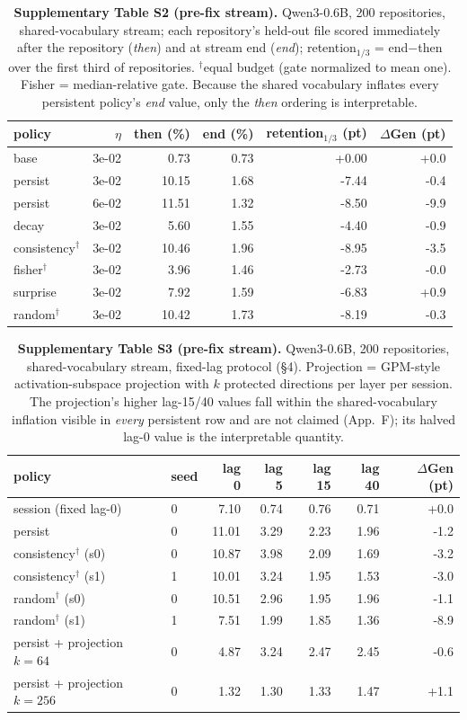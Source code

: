 \begin{table}[h]\centering\small
\caption{\textbf{Supplementary Table S2 (pre-fix stream).} Qwen3-0.6B, 200 repositories, shared-vocabulary stream; each repository's held-out file scored immediately after the repository (\emph{then}) and at stream end (\emph{end}); retention$_{1/3}$ = end$-$then over the first third of repositories. $^\dagger$equal budget (gate normalized to mean one). Fisher = median-relative gate. Because the shared vocabulary inflates every persistent policy's \emph{end} value, only the \emph{then} ordering is interpretable.}
\begin{tabular}{l r r r r r}\toprule
policy & $\eta$ & then (\%) & end (\%) & retention$_{1/3}$ (pt) & $\Delta$Gen (pt)\\\midrule
base & 3e-02 & 0.73 & 0.73 & +0.00 & +0.0 \\
persist & 3e-02 & 10.15 & 1.68 & -7.44 & -0.4 \\
persist & 6e-02 & 11.51 & 1.32 & -8.50 & -9.9 \\
decay & 3e-02 & 5.60 & 1.55 & -4.40 & -0.9 \\
consistency$^\dagger$ & 3e-02 & 10.46 & 1.96 & -8.95 & -3.5 \\
fisher$^\dagger$ & 3e-02 & 3.96 & 1.46 & -2.73 & -0.0 \\
surprise & 3e-02 & 7.92 & 1.59 & -6.83 & +0.9 \\
random$^\dagger$ & 3e-02 & 10.42 & 1.73 & -8.19 & -0.3 \\
\bottomrule\end{tabular}\end{table}

\begin{table}[h]\centering\small
\caption{\textbf{Supplementary Table S3 (pre-fix stream).} Qwen3-0.6B, 200 repositories, shared-vocabulary stream, fixed-lag protocol (\S4). Projection = GPM-style activation-subspace projection with $k$ protected directions per layer per session. The projection's higher lag-15/40 values fall within the shared-vocabulary inflation visible in \emph{every} persistent row and are not claimed (App.~F); its halved lag-0 value is the interpretable quantity.}
\begin{tabular}{l l r r r r r}\toprule
policy & seed & lag 0 & lag 5 & lag 15 & lag 40 & $\Delta$Gen (pt)\\\midrule
session (fixed lag-0) & 0 & 7.10 & 0.74 & 0.76 & 0.71 & +0.0 \\
persist & 0 & 11.01 & 3.29 & 2.23 & 1.96 & -1.2 \\
consistency$^\dagger$ (s0) & 0 & 10.87 & 3.98 & 2.09 & 1.69 & -3.2 \\
consistency$^\dagger$ (s1) & 1 & 10.01 & 3.24 & 1.95 & 1.53 & -3.0 \\
random$^\dagger$ (s0) & 0 & 10.51 & 2.96 & 1.95 & 1.96 & -1.1 \\
random$^\dagger$ (s1) & 1 & 7.51 & 1.99 & 1.85 & 1.36 & -8.9 \\
persist + projection $k{=}64$ & 0 & 4.87 & 3.24 & 2.47 & 2.45 & -0.6 \\
persist + projection $k{=}256$ & 0 & 1.32 & 1.30 & 1.33 & 1.47 & +1.1 \\
\bottomrule\end{tabular}\end{table}